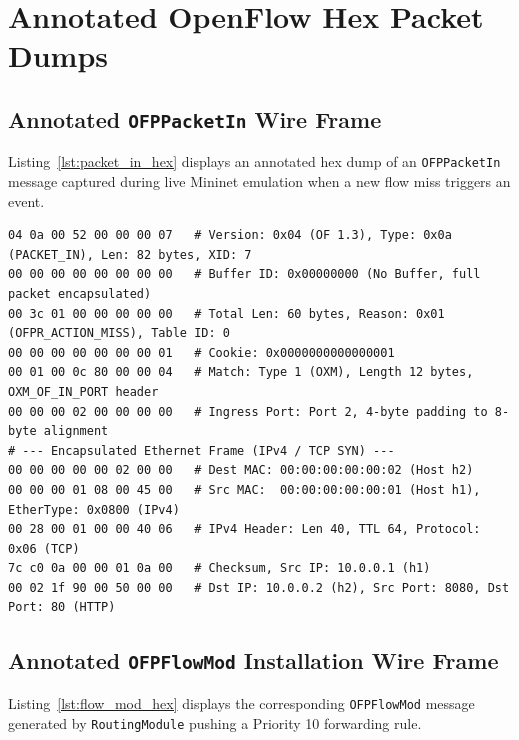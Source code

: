 \documentclass[12pt,a4paper,oneside]{report}
\begin{document}
\section{Annotated OpenFlow Hex Packet Dumps}

\subsection{Annotated \texttt{OFPPacketIn} Wire Frame}
Listing~\ref{lst:packet_in_hex} displays an annotated hex dump of an \texttt{OFPPacketIn} message captured during live Mininet emulation when a new flow miss triggers an event.

\begin{lstlisting}[basicstyle=\ttfamily\scriptsize, caption={Annotated Hex Dump of OFPPacketIn Message}, label={lst:packet_in_hex}]
04 0a 00 52 00 00 00 07   # Version: 0x04 (OF 1.3), Type: 0x0a (PACKET_IN), Len: 82 bytes, XID: 7
00 00 00 00 00 00 00 00   # Buffer ID: 0x00000000 (No Buffer, full packet encapsulated)
00 3c 01 00 00 00 00 00   # Total Len: 60 bytes, Reason: 0x01 (OFPR_ACTION_MISS), Table ID: 0
00 00 00 00 00 00 00 01   # Cookie: 0x0000000000000001
00 01 00 0c 80 00 00 04   # Match: Type 1 (OXM), Length 12 bytes, OXM_OF_IN_PORT header
00 00 00 02 00 00 00 00   # Ingress Port: Port 2, 4-byte padding to 8-byte alignment
# --- Encapsulated Ethernet Frame (IPv4 / TCP SYN) ---
00 00 00 00 00 02 00 00   # Dest MAC: 00:00:00:00:00:02 (Host h2)
00 00 00 01 08 00 45 00   # Src MAC:  00:00:00:00:00:01 (Host h1), EtherType: 0x0800 (IPv4)
00 28 00 01 00 00 40 06   # IPv4 Header: Len 40, TTL 64, Protocol: 0x06 (TCP)
7c c0 0a 00 00 01 0a 00   # Checksum, Src IP: 10.0.0.1 (h1)
00 02 1f 90 00 50 00 00   # Dst IP: 10.0.0.2 (h2), Src Port: 8080, Dst Port: 80 (HTTP)
\end{lstlisting}

\subsection{Annotated \texttt{OFPFlowMod} Installation Wire Frame}
Listing~\ref{lst:flow_mod_hex} displays the corresponding \texttt{OFPFlowMod} message generated by \texttt{RoutingModule} pushing a Priority 10 forwarding rule.
\end{document}
